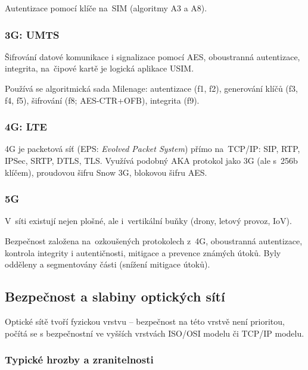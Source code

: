 Autentizace pomocí klíče na~SIM (algoritmy A3 a A8).


\subsubsection{3G: UMTS}

Šifrování datové komunikace i signalizace pomocí AES, oboustranná autentizace, integrita, na~čipové kartě je logická aplikace USIM.

Používá se algoritmická sada Milenage: autentizace (f1, f2), generování klíčů (f3, f4, f5), šifrování (f8; AES-CTR+OFB), integrita (f9).


\subsubsection{4G: LTE}

4G je packetová síť (EPS: \emph{Evolved Packet System}) přímo na~TCP/IP: SIP, RTP, IPSec, SRTP, DTLS, TLS.
Využívá podobný AKA protokol jako 3G (ale s~256b klíčem), proudovou šifru Snow 3G, blokovou šifru AES.


\subsubsection{5G}

V~síti existují nejen plošné, ale i~vertikální buňky (drony, letový provoz, IoV).

Bezpečnost založena na~ozkoušených protokolech z~4G, oboustranná autentizace, kontrola integrity i autentičnosti, mitigace a prevence známých útoků.
Byly odděleny a segmentovány části (snížení mitigace útoků).


\subsection{Bezpečnost a slabiny optických sítí}

Optické sítě tvoří fyzickou vrstvu – bezpečnost na této vrstvě není prioritou, počítá se s bezpečnostní ve vyšších vrstvách ISO/OSI modelu či TCP/IP modelu. 


\subsubsection{Typické hrozby a zranitelnosti}

